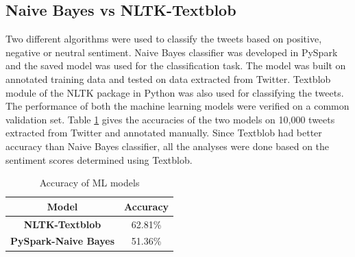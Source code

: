 \documentclass[9pt,twocolumn,twoside]{styles/osajnl}
\begin{document}
\subsection{Naive Bayes vs NLTK-Textblob}
Two different algorithms were used to classify the tweets based on positive, negative or neutral sentiment. Naive Bayes classifier was developed in PySpark and the saved model was used for the classification task. The model was built on annotated training data and tested on data extracted from Twitter. Textblob module of the NLTK package in Python was also used for classifying the tweets. The performance of both the machine learning models were verified on a common validation set. Table \ref{tab-acc} gives the accuracies of the two models on 10,000 tweets extracted from Twitter and annotated manually. Since Textblob had better accuracy than Naive Bayes classifier, all the analyses were done based on the sentiment scores determined using Textblob. 
\begin{table}[htb]
\centering
\caption{Accuracy of ML models}
\label{tab-acc}
\begin{tabular}{@{}cc@{}}
\toprule
\textbf{Model}               & \textbf{Accuracy} \\ \midrule
\textbf{NLTK-Textblob}       & 62.81\%           \\
\textbf{PySpark-Naive Bayes} & 51.36\%           \\ \bottomrule
\end{tabular}
\end{table}
\end{document}
